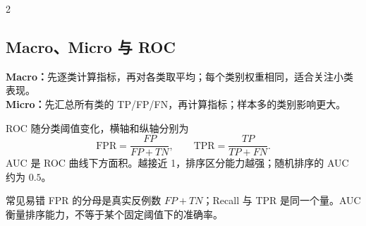 \documentclass[9pt,a4paper,UTF8]{ctexart}
\begin{document}
\begin{multicols}{2}
\subsection{Macro、Micro 与 ROC}
\textbf{Macro：}先逐类计算指标，再对各类取平均；每个类别权重相同，适合关注小类表现。\\
\textbf{Micro：}先汇总所有类的 TP/FP/FN，再计算指标；样本多的类别影响更大。

ROC 随分类阈值变化，横轴和纵轴分别为
\[
\mathrm{FPR}=\frac{FP}{FP+TN},\qquad
\mathrm{TPR}=\frac{TP}{TP+FN}.
\]
AUC 是 ROC 曲线下方面积。越接近 1，排序区分能力越强；随机排序的 AUC 约为 $0.5$。

\begin{warnbox}{常见易错}
FPR 的分母是真实反例数 $FP+TN$；Recall 与 TPR 是同一个量。AUC 衡量排序能力，不等于某个固定阈值下的准确率。
\end{warnbox}
\end{multicols}
\end{document}
